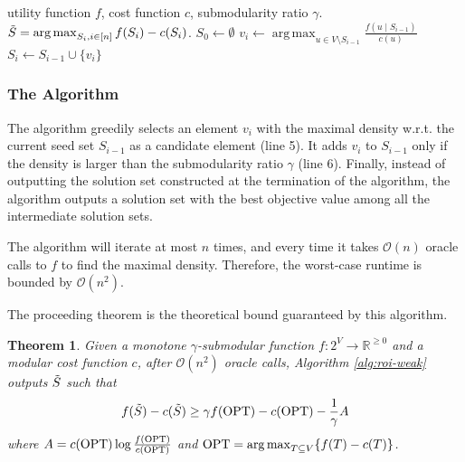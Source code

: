 \documentclass[10pt]{article} %
\DeclareMathOperator*{\argmax}{arg\,max}
\newtheorem{theorem}{Theorem}
\theoremstyle{remark}
\newcommand{\OPT}{{\rm OPT}}
\begin{document}
\begin{algorithm}[H]
   \caption{\textsc{$\gamma$-ROI}($f, c, \gamma$)}
   \label{alg:roi-weak}
\begin{algorithmic}[1]
    utility function $f$, cost function $c$, submodularity ratio $\gamma$.
    $\Tilde{S} = \argmax_{S_i, i \in [n]} f(S_i)-c(S_i)$.
   \vspace{.05in}
   \STATE $S_0 \gets \emptyset$
    \STATE $v_i \gets \argmax_{u \in V \setminus S_{i-1}} \frac{f(u \mid S_{i-1})}{c(u)}$
            \STATE $S_i \gets S_{i-1} \cup \{v_i\}$  
        \ELSE
        \ENDIF 
    \ENDFOR
\end{algorithmic}
\end{algorithm}



\subsubsection{The Algorithm}
The algorithm greedily selects an element $v_i$ with the maximal density w.r.t. the current seed set $S_{i-1}$ as a candidate element (line 5). It adds  $v_i$ to $S_{i-1}$ only if the density is larger than the submodularity ratio $\gamma$ (line 6). Finally, instead of outputting the solution set constructed at the termination of the algorithm, the algorithm outputs a solution set with the best objective value among all the intermediate solution sets. 

The algorithm will iterate at most $n$ times, and every time it takes $\mathcal{O}(n)$ oracle calls to $f$ to find the maximal density. Therefore, the worst-case runtime is bounded by $\mathcal{O}(n^2)$.

The proceeding theorem is the theoretical bound guaranteed by this algorithm. 


\begin{theorem}
\label{th:unconstrained-greedy}
    Given a monotone $\gamma$-submodular function $f:2^{V} \rightarrow \mathbb{R}^{\geq 0}$ and a modular cost function $c$, after $\mathcal{O}(n^2)$ oracle calls,  Algorithm \ref{alg:roi-weak} outputs $\Tilde{S}$ such that
    \[f(\Tilde{S})-c(\Tilde{S}) \geq \gamma f(\OPT)-c(\OPT)- \frac{1}{\gamma}A\]
    where $A = c(\OPT) \log \frac{f(\OPT)}{c(\OPT)}$ and $\OPT =  \argmax_{T \subseteq V}\{f(T)-c(T)\}$.
\end{theorem}
\end{document}
